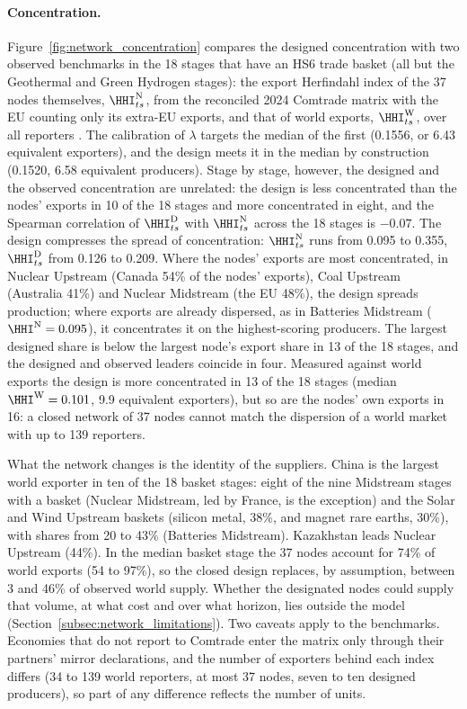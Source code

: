 \paragraph{Concentration.} Figure~\ref{fig:network_concentration} compares the designed
concentration with two observed benchmarks in the 18 stages that have an HS6 trade basket (all
but the Geothermal and Green Hydrogen stages): the export Herfindahl index of the 37 nodes
themselves, $\HHI^{\mathrm{N}}_{ts}$, from the reconciled 2024 Comtrade matrix with the EU
counting only its extra-EU exports, and that of world exports, $\HHI^{\mathrm{W}}_{ts}$, over all
reporters \citep{uncomtrade}. The calibration of $\lambda$ targets the median of the first
(0.1556, or 6.43 equivalent exporters), and the design meets it in the median by construction
(0.1520, 6.58 equivalent producers). Stage by stage, however, the designed and the observed
concentration are unrelated: the design is less concentrated than the nodes' exports in 10 of
the 18 stages and more concentrated in eight, and the Spearman correlation of
$\HHI^{\mathrm{D}}_{ts}$ with $\HHI^{\mathrm{N}}_{ts}$ across the 18 stages is $-0.07$. The
design compresses the spread of concentration: $\HHI^{\mathrm{N}}_{ts}$ runs from 0.095 to 0.355,
$\HHI^{\mathrm{D}}_{ts}$ from 0.126 to 0.209. Where the nodes' exports are most concentrated, in
Nuclear Upstream (Canada 54\% of the nodes' exports), Coal Upstream (Australia 41\%) and Nuclear
Midstream (the EU 48\%), the design spreads production; where exports are already dispersed, as
in Batteries Midstream ($\HHI^{\mathrm{N}}=0.095$), it concentrates it on the highest-scoring
producers. The largest designed share is below the largest node's export share in 13 of the 18
stages, and the designed and observed leaders coincide in four. Measured against world exports
the design is more concentrated in 13 of the 18 stages (median $\HHI^{\mathrm{W}}=0.101$, 9.9
equivalent exporters), but so are the nodes' own exports in 16: a closed network of 37 nodes
cannot match the dispersion of a world market with up to 139 reporters.

What the network changes is the identity of the suppliers. China is the largest world exporter
in ten of the 18 basket stages: eight of the nine Midstream stages with a basket (Nuclear
Midstream, led by France, is the exception) and the Solar and Wind Upstream baskets (silicon
metal, 38\%, and magnet rare earths, 30\%), with shares from 20 to 43\% (Batteries Midstream).
Kazakhstan leads Nuclear Upstream (44\%). In the median basket stage the 37 nodes account for
74\% of world exports (54 to 97\%), so the closed design replaces, by assumption, between 3 and
46\% of observed world supply. Whether the designated nodes could supply that volume, at what
cost and over what horizon, lies outside the model (Section~\ref{subsec:network_limitations}).
Two caveats apply to the benchmarks. Economies that do not report to Comtrade enter the matrix
only through their partners' mirror declarations, and the number of exporters behind each index
differs (34 to 139 world reporters, at most 37 nodes, seven to ten designed producers), so part of
any difference reflects the number of units.

